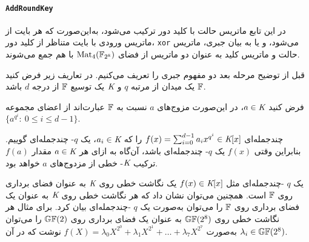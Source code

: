 \paragraph*{\texttt{AddRoundKey}}
در این تابع ماتریس حالت با کلید دور ترکیب می‌شود، به‌این‌صورت که هر بایت از ماتریس ورودی با بایت متناظر از کلید دور،
\texttt{xor}
می‌شود، و یا به بیان جبری، ماتریس حالت و ماتریس کلید به عنوان دو ماتریس از فضای 
$\operatorname{\mathrm{Mat}}_{4}(\mathbb{F}_{2^{8}})$
با هم جمع می‌شوند. 

قبل از توضیح مرحله بعد دو مفهوم جبری را تعریف می‌کنیم. در تعاریف زیر فرض کنید 
$\mathbb{F}$
یک میدان از مرتبه 
$q$
و 
$\textit{K}$
یک توسیع 
$\mathbb{F}$
از درجه 
$d$
باشد. 
\begin{definition}
فرض کنید 
$a\in\textit{K}$، 
در این‌صورت مزوج‌های 
$a$
نسبت به 
$\mathbb{F}$
عبارت‌اند از اعضای مجموعه 
$\{a^{q^{i}}: \ 0\leq i\leq d-1\}$.
\end{definition}
\begin{definition}
چندجمله‌ای 
$f(x) = \sum_{i = 0}^{d-1}a_{i}x^{q^{i}}\in\textit{K}[x]$ 
را که 
$a_{i}\in \textit{K}$، 
یک 
$q$-
چندجمله‌ای گوییم. بنابراین وقتی 
$f(x)$
یک 
$q$-
چندجمله‌ای باشد، آن‌گاه به ازای هر 
$a\in \textit{K}$
مقدار 
$f(a)$
ترکیب 
$\textit{K}$-
خطی از مزدوج‌های 
$a$
خواهد بود. 
\end{definition}
یک 
$q$
-چندجمله‌ای مثل 
$f(x)\in\textit{K}[x]$
یک نگاشت خطی روی 
$\textit{K}$
به عنوان فضای برداری  روی 
$\mathbb{F}$ 
است. همچنین می‌توان نشان داد که هر نگاشت خطی روی 
$\textit{K}$ 
به عنوان یک فضای برداری روی 
$\mathbb{F}$
را می‌توان به‌صورت یک 
$q$
-چندجمله‌ای بیان کرد. برای مثال هر نگاشت خطی روی 
$\mathbb{GF}(2^{8})$
به عنوان یک فضای برداری روی 
$\mathbb{GF}(2)$
را می‌توان به‌صورت 
$f(X) = \lambda_{0}X^{2^{0}} + \lambda_{1}X^{2^{1}} + \ldots + \lambda_{7}X^{2^{7}}$
 نوشت که در آن 
 $\lambda_{i}\in \mathbb{GF}(2^{8})$.
